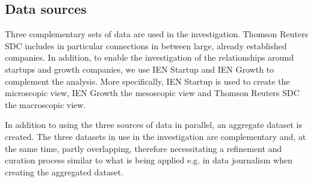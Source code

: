 \subsection{Data sources}

Three complementary sets of data are used in the investigation. Thomson Reuters SDC includes in particular connections in between large, already established companies. In addition, to enable the investigation of the relationships around startups and growth companies, we use IEN Startup and IEN Growth to complement the analysis. More specifically, IEN Startup is used to create the microscopic view, IEN Growth the mesoscopic view and Thomson Reuters SDC the macroscopic view.

In addition to using the three sources of data in parallel, an aggregate dataset is created. The three datasets in use in the investigation are complementary and, at the same time, partly overlapping, therefore necessitating a refinement and curation process similar to what is being applied e.g. in data journalism \citep[cf.][]{2012DataHandbook} when creating the aggregated dataset.

